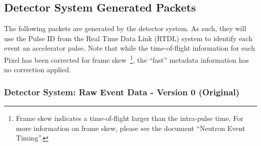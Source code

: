 \subsection{Detector System Generated Packets}

The following packets are generated by the detector system. As such, they will
use the Pulse ID from the Real Time Data Link (RTDL) system to identify each
event an accelerator pulse. Note that while the time-of-flight information for
each Pixel has been corrected for frame skew~\footnote{Frame skew indicates a
time-of-flight larger than the intra-pulse time.  For more information on frame
skew, please see the document ``Neutron Event Timing''.}, the ``fast'' metadata
information has no correction applied.



\newpage
\subsubsection{Detector System: Raw Event Data - Version 0 (Original)}
\label{section:protocol_raw_event_packet_v0}

